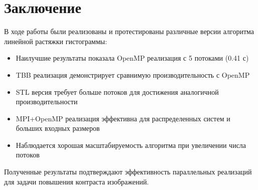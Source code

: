 \documentclass[14pt,a4paper]{extarticle}
\begin{document}
\newpage
\section{Заключение}

В ходе работы были реализованы и протестированы различные версии алгоритма линейной растяжки гистограммы:

\begin{itemize}
    \item Наилучшие результаты показала OpenMP реализация с 5 потоками (0.41 с)
    \item TBB реализация демонстрирует сравнимую производительность с OpenMP
    \item STL версия требует больше потоков для достижения аналогичной производительности
    \item MPI+OpenMP реализация эффективна для распределенных систем и больших входных размеров
    \item Наблюдается хорошая масштабируемость алгоритма при увеличении числа потоков
\end{itemize}

Полученные результаты подтверждают эффективность параллельных реализаций для задачи повышения контраста изображений.
\end{document}
